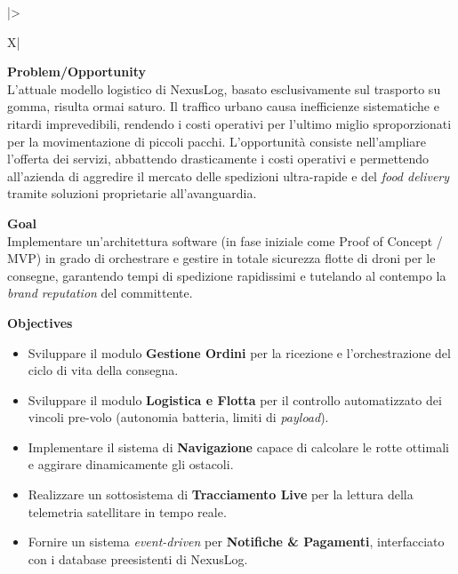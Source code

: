 \documentclass[12pt, a4paper]{article}
\begin{document}
\begin{xltabular}{\textwidth}{|>{\raggedright\arraybackslash}X|}
    \hline
    \textbf{Problem/Opportunity} \\
    \hline
    L'attuale modello logistico di NexusLog, basato esclusivamente sul trasporto su gomma, risulta ormai saturo. Il traffico urbano causa inefficienze sistematiche e ritardi imprevedibili, rendendo i costi operativi per l'ultimo miglio sproporzionati per la movimentazione di piccoli pacchi. L'opportunità consiste nell'ampliare l'offerta dei servizi, abbattendo drasticamente i costi operativi e permettendo all'azienda di aggredire il mercato delle spedizioni ultra-rapide e del \textit{food delivery} tramite soluzioni proprietarie all'avanguardia. \\
    \hline
    
    \textbf{Goal} \\
    \hline
    Implementare un'architettura software (in fase iniziale come Proof of Concept / MVP) in grado di orchestrare e gestire in totale sicurezza flotte di droni per le consegne, garantendo tempi di spedizione rapidissimi e tutelando al contempo la \textit{brand reputation} del committente. \\
    \hline
    
    \textbf{Objectives} \\
    \hline
    \begin{itemize}[leftmargin=*, noitemsep, topsep=0pt]
        \item Sviluppare il modulo \textbf{Gestione Ordini} per la ricezione e l'orchestrazione del ciclo di vita della consegna.
        \item Sviluppare il modulo \textbf{Logistica e Flotta} per il controllo automatizzato dei vincoli pre-volo (autonomia batteria, limiti di \textit{payload}).
        \item Implementare il sistema di \textbf{Navigazione} capace di calcolare le rotte ottimali e aggirare dinamicamente gli ostacoli.
        \item Realizzare un sottosistema di \textbf{Tracciamento Live} per la lettura della telemetria satellitare in tempo reale.
        \item Fornire un sistema \textit{event-driven} per \textbf{Notifiche \& Pagamenti}, interfacciato con i database preesistenti di NexusLog.
    \end{itemize} \\
    \hline


\end{xltabular}
\end{document}
